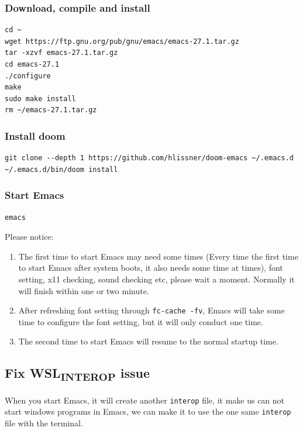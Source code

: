 \documentclass[10pt]{article}
\begin{document}
\subsubsection{Download, compile and install}
\label{sec:org9c15865}
\begin{verbatim}
cd ~
wget https://ftp.gnu.org/pub/gnu/emacs/emacs-27.1.tar.gz
tar -xzvf emacs-27.1.tar.gz
cd emacs-27.1
./configure
make
sudo make install
rm ~/emacs-27.1.tar.gz
\end{verbatim}

\subsubsection{Install doom}
\label{sec:org6e10c66}
\begin{verbatim}
git clone --depth 1 https://github.com/hlissner/doom-emacs ~/.emacs.d
~/.emacs.d/bin/doom install
\end{verbatim}

\subsubsection{Start Emacs}
\label{sec:org638f6c8}
\begin{verbatim}
emacs
\end{verbatim}

Please notice:
\begin{enumerate}
\item The first time to start Emacs may need some times (Every time the first time to start Emacs after system boots, it also needs some time at times), font setting, x11 checking, sound checking etc, please wait a moment. Normally it will finish within one or two minute.
\item After refreshing font setting through \texttt{fc-cache -fv}, Emacs will take some time to configure the font setting, but it will only conduct one time.
\item The second time to start Emacs will resume to the normal startup time.
\end{enumerate}

\subsection{Fix WSL\textsubscript{INTEROP} issue}
\label{sec:org5a60202}
When you start Emacs, it will create another \texttt{interop} file, it make us can not start windows programs in Emacs, we can make it to use the one same \texttt{interop} file with the terminal.
\end{document}
